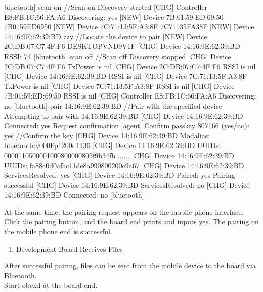 \documentclass[letterpaper,10pt,openany,english]{sphinxmanual}
\begin{document}
\begin{sphinxVerbatim}[commandchars=\\\{\}]
bluetooth]\PYGZsh{} scan on        //Scan on
Discovery started
[CHG] Controller E8:FB:1C:66:FA:A6 Discovering: yes
[NEW] Device 7B:01:59:ED:69:50 7B\PYGZhy{}01\PYGZhy{}59\PYGZhy{}ED\PYGZhy{}69\PYGZhy{}50
[NEW] Device 7C:71:13:5F:A3:8F 7C\PYGZhy{}71\PYGZhy{}13\PYGZhy{}5F\PYGZhy{}A3\PYGZhy{}8F
[NEW] Device 14:16:9E:62:39:BD zzy  //Locate the device to pair
[NEW] Device 2C:DB:07:C7:4F:F6 DESKTOP\PYGZhy{}VND9V1F
[CHG] Device 14:16:9E:62:39:BD RSSI: \PYGZhy{}74
[bluetooth]\PYGZsh{} scan off        //Scan off
Discovery stopped
[CHG] Device 2C:DB:07:C7:4F:F6 TxPower is nil
[CHG] Device 2C:DB:07:C7:4F:F6 RSSI is nil
[CHG] Device 14:16:9E:62:39:BD RSSI is nil
[CHG] Device 7C:71:13:5F:A3:8F TxPower is nil
[CHG] Device 7C:71:13:5F:A3:8F RSSI is nil
[CHG] Device 7B:01:59:ED:69:50 RSSI is nil
[CHG] Controller E8:FB:1C:66:FA:A6 Discovering: no
[bluetooth]\PYGZsh{} pair 14:16:9E:62:39:BD        //Pair with the specified device
Attempting to pair with 14:16:9E:62:39:BD
[CHG] Device 14:16:9E:62:39:BD Connected: yes
Request confirmation
[agent] Confirm passkey 807166 (yes/no): yes        //Confirm the key
[CHG] Device 14:16:9E:62:39:BD Modalias: bluetooth:v000Fp1200d1436
[CHG] Device 14:16:9E:62:39:BD UUIDs: 00001105\PYGZhy{}0000\PYGZhy{}1000\PYGZhy{}8000\PYGZhy{}00805f9b34fb
......
[CHG] Device 14:16:9E:62:39:BD UUIDs: fa88c0d0\PYGZhy{}afac\PYGZhy{}11de\PYGZhy{}8a99\PYGZhy{}0800200c9a67
[CHG] Device 14:16:9E:62:39:BD ServicesResolved: yes
[CHG] Device 14:16:9E:62:39:BD Paired: yes
Pairing successful
[CHG] Device 14:16:9E:62:39:BD ServicesResolved: no
[CHG] Device 14:16:9E:62:39:BD Connected: no
[bluetooth]\PYGZsh{}
\end{sphinxVerbatim}

\sphinxAtStartPar
At the same time, the pairing request appears on the mobile phone interface. Click the pairing button, and the board end prints and inputs yes. The pairing on the mobile phone end is successful.
\begin{enumerate}
%
\setcounter{enumi}{3}
\item {} 
\sphinxAtStartPar
Development Board Receives Files

\end{enumerate}

\sphinxAtStartPar
After successful pairing, files can be sent from the mobile device to the board via Bluetooth.\\
Start obexd at the board end.
\end{document}
